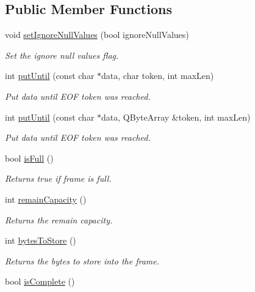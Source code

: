 \subsection*{Public Member Functions}
\begin{DoxyCompactItemize}
\item 
void \hyperlink{classmdt_frame_ac1a8ad77ce7bd6d08032056c3610d5c0}{setIgnoreNullValues} (bool ignoreNullValues)
\begin{DoxyCompactList}\small\item\em Set the ignore null values flag. \end{DoxyCompactList}\item 
int \hyperlink{classmdt_frame_af03d60dadc6bd33b3a333cf484463113}{putUntil} (const char $\ast$data, char token, int maxLen)
\begin{DoxyCompactList}\small\item\em Put data until EOF token was reached. \end{DoxyCompactList}\item 
int \hyperlink{classmdt_frame_aaa5c15df5aaf026b02f34639438036ad}{putUntil} (const char $\ast$data, QByteArray \&token, int maxLen)
\begin{DoxyCompactList}\small\item\em Put data until EOF token was reached. \end{DoxyCompactList}\item 
\hypertarget{classmdt_frame_ab4e0fee7198c94c16f2fa6eb4b6b1562}{
bool \hyperlink{classmdt_frame_ab4e0fee7198c94c16f2fa6eb4b6b1562}{isFull} ()}
\label{classmdt_frame_ab4e0fee7198c94c16f2fa6eb4b6b1562}

\begin{DoxyCompactList}\small\item\em Returns true if frame is full. \end{DoxyCompactList}\item 
\hypertarget{classmdt_frame_aa1cd5c914c36efb3f441b7f6e782dc24}{
int \hyperlink{classmdt_frame_aa1cd5c914c36efb3f441b7f6e782dc24}{remainCapacity} ()}
\label{classmdt_frame_aa1cd5c914c36efb3f441b7f6e782dc24}

\begin{DoxyCompactList}\small\item\em Returns the remain capacity. \end{DoxyCompactList}\item 
int \hyperlink{classmdt_frame_a8526b227a56562fddf8445060e8095d4}{bytesToStore} ()
\begin{DoxyCompactList}\small\item\em Returns the bytes to store into the frame. \end{DoxyCompactList}\item 
\hypertarget{classmdt_frame_a2a8fb9f36c941282881bba0c538d1ce5}{
bool \hyperlink{classmdt_frame_a2a8fb9f36c941282881bba0c538d1ce5}{isComplete} ()}
\label{classmdt_frame_a2a8fb9f36c941282881bba0c538d1ce5}


\end{DoxyCompactItemize}
